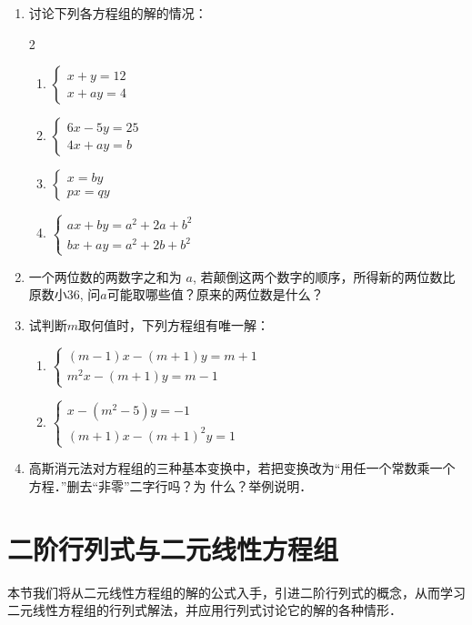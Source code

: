 \begin{enumerate}
    \item 讨论下列各方程组的解的情况：
\begin{multicols}{2}
\begin{enumerate}    
    \item $\begin{cases}
      x+y=12\\ x+ay=4  
    \end{cases}$
    \item $\begin{cases}
        6x-5y=25\\4x+ay=b
    \end{cases}$
    \item $\begin{cases}
        x=by\\px=qy
    \end{cases}$
    \item $\begin{cases}
        ax+by=a^2+2a+b^2\\
        bx+ay=a^2+2b+b^2
    \end{cases}$
\end{enumerate}    
\end{multicols}
    \item 一个两位数的两数字之和为 $a$, 若颠倒这两个数字的顺序，所得新的两位数比原数小36, 问$a$可能取哪些值？原来的两位数是什么？
    \item 试判断$m$取何值时，下列方程组有唯一解：
\begin{enumerate}
    \item $\begin{cases}
        (m-1)x-(m+1)y=m+1\\ m^2x-(m+1)y=m-1
    \end{cases}$
    \item $\begin{cases}
x-(m^2-5)y=-1\\ (m+1)x -(m+1)^2y=1       
    \end{cases}$
\end{enumerate}

\item  高斯消元法对方程组的三种基本变换中，若把变换改为“用任一个常数乘一个方程．”删去“非零”二字行吗？为
什么？举例说明．
\end{enumerate}

\section{二阶行列式与二元线性方程组}
本节我们将从二元线性方程组的解的公式入手，引进二阶行列式的概念，从而学习二元线性方程组的行列式解法，并应用行列式讨论它的解的各种情形．

